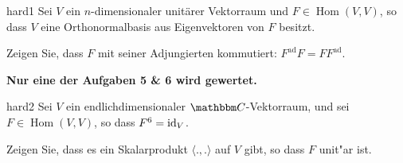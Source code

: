 \documentclass[a4paper]{article}
\DeclareMathOperator{\Hom}{Hom}
\begin{document}
\begin{klaufg}{8}{hard1}
Sei $V$ ein $n$-dimensionaler unitärer Vektorraum und $F \in
\Hom(V,V)$, so dass $V$ eine Orthonormalbasis aus Eigenvektoren von $F$
besitzt.

Zeigen Sie, dass $F$ mit seiner Adjungierten kommutiert:
$F^{\mathrm{ad}}F = FF^{\mathrm{ad}}$.
\end{klaufg}

\pagebreak
{\bfseries Nur eine der Aufgaben 5 \& 6 wird gewertet.}
\bigskip
\bigskip

\begin{klaufg}{8}{hard2}
Sei $V$ ein endlichdimensionaler $\C$-Vektorraum, und sei $F \in
\Hom(V,V)$, so dass $F^6 = {\rm id}_V$.

Zeigen Sie, dass es ein Skalarprodukt $\langle .,. \rangle$ auf $V$
gibt, so dass $F$ unit"ar ist.  
\end{klaufg}
\end{document}
